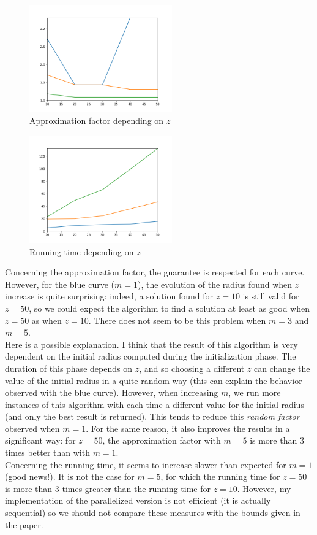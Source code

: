\documentclass[a4paper]{article}%
\begin{document}
	\begin{figure}[h]
		\caption{Approximation factor depending on $z$}
		\centering
		\includegraphics[width=0.55\textwidth]{curve_r}
	\end{figure}
	\begin{figure}[h]
		\caption{Running time depending on $z$}
		\centering
		\includegraphics[width=0.55\textwidth]{curve_t}
	\end{figure}

	Concerning the approximation factor, the guarantee is respected for each curve.
	However, for the blue curve ($m=1$), the evolution of the radius found when $z$ increase is quite surprising:
	indeed, a solution found for $z=10$ is still valid for $z=50$, so we could expect the algorithm to
	find a solution at least as good when $z=50$ as when $z=10$. There does not seem to be this problem when $m=3$ and $m=5$.\\
	
	Here is a possible explanation. I think that the result of this algorithm is very dependent on the initial radius
	computed during the initialization phase. The duration of this phase depends on $z$, and so choosing a different
	$z$ can change the value of the initial radius in a quite random way (this can explain the behavior observed
	with the blue curve). However, when increasing $m$, we run more instances of this algorithm with each time
	a different value for the initial radius (and only the best result is returned). This tends to reduce this
	\textit{random factor} observed when $m=1$. For the same reason, it also improves the results in a significant way:
	for $z=50$, the approximation factor with $m=5$ is more than 3 times better than with $m=1$.\\

	Concerning the running time, it seems to increase slower than expected for $m=1$ (good news!).
	It is not the case for $m=5$, for which the running time for $z=50$ is more than 3 times greater than the running time for $z=10$.
	However, my implementation of the parallelized version is not efficient (it is actually sequential) so we should not
	compare these measures with the bounds given in the paper.

	
\end{document}
